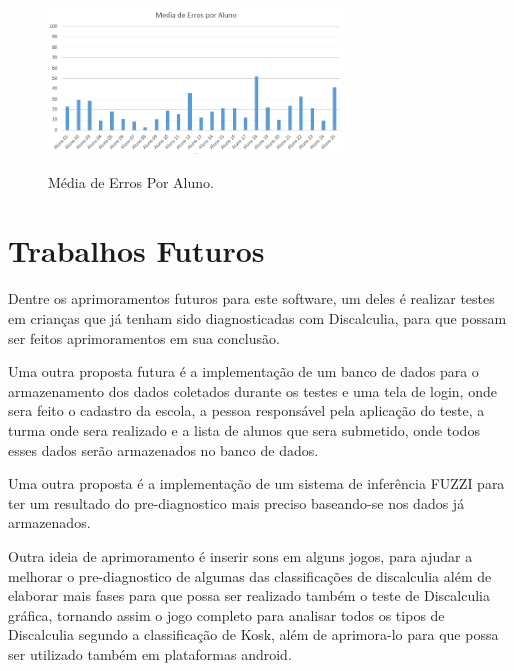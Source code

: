\documentclass[
	12pt,				%
    oneside,			%
	a4paper,			%
	english,			%
	french,				%
	spanish,			%
	brazil,				%
	]{abntex2}
\begin{document}
\begin{figure} [h] 


\caption{Média de Erros Por Aluno.}

\includegraphics[width=0.70\textwidth]{ErrosPorAluno.png} %
\centering
\\
\label{ErrosPorAluno}
\end{figure}

\section{Trabalhos Futuros}

Dentre os aprimoramentos futuros para este software, um deles é realizar testes em crianças que já tenham sido diagnosticadas com Discalculia, para que possam ser feitos aprimoramentos em sua conclusão.

Uma outra proposta futura é a implementação de um banco de dados para o armazenamento dos dados coletados durante os testes e uma tela de login, onde sera feito o cadastro da escola, a pessoa responsável pela aplicação do teste, a turma onde sera realizado e a lista de alunos que sera submetido, onde todos esses dados serão armazenados no banco de dados.

Uma outra proposta é a implementação de um sistema de inferência FUZZI para ter um resultado do pre-diagnostico mais preciso baseando-se nos dados já armazenados.

Outra ideia  de aprimoramento é inserir sons em alguns jogos, para ajudar a melhorar o pre-diagnostico de algumas das classificações de discalculia além de elaborar mais fases para que possa  ser realizado também o teste de Discalculia gráfica, tornando assim o jogo completo para analisar todos os tipos de Discalculia segundo a classificação de Kosk, além de aprimora-lo para que possa ser utilizado também em plataformas android.  
\end{document}

